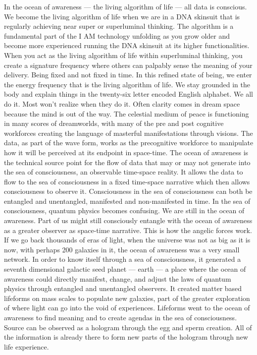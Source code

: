 \documentclass[letterpaper,11pt,twoside,titlepage,onecolumn,openany]{book}
\begin{document}
In the ocean of awareness --- the living algorithm of life --- all data
is conscious. We become the living algorithm of life when we are in a
DNA skinsuit that is regularly achieving near super or superluminal
thinking. The algorithm is a fundamental part of the I AM technology
unfolding as you grow older and become more experienced running the DNA
skinsuit at its higher functionalities. When you act as the living
algorithm of life within superluminal thinking, you create a signature
frequency where others can palpably sense the meaning of your delivery.
Being fixed and not fixed in time. In this refined state of being, we
enter the energy frequency that is the living algorithm of life. We stay
grounded in the body and explain things in the twenty-six letter encoded
English alphabet. We all do it. Most won't realize when they do it.
Often clarity comes in dream space because the mind is out of the way.
The celestial medium of peace is functioning in many scores of
dreamworlds, with many of the pre and post cognitive workforces creating
the language of masterful manifestations through visions. The data, as
part of the wave form, works as the precognitive workforce to manipulate
how it will be perceived at its endpoint in space-time. The ocean of
awareness is the technical source point for the flow of data that may or
may not generate into the sea of consciousness, an observable time-space
reality. It allows the data to flow to the sea of consciousness in a
fixed time-space narrative which then allows consciousness to observe
it. Consciousness in the sea of consciousness can both be entangled and
unentangled, manifested and non-manifested in time. In the sea of
consciousness, quantum physics becomes confusing. We are still in the
ocean of awareness. Part of us might still consciously entangle with the
ocean of awareness as a greater observer as space-time narrative. This
is how the angelic forces work. If we go back thousands of eras of
light, when the universe was not as big as it is now, with perhaps 200
galaxies in it, the ocean of awareness was a very small network. In
order to know itself through a sea of consciousness, it generated a
seventh dimensional galactic seed planet --- earth --- a place where the
ocean of awareness could directly manifest, change, and adjust the laws
of quantum physics through entangled and unentangled observers. It
created matter based lifeforms on mass scales to populate new galaxies,
part of the greater exploration of where light can go into the void of
experiences. Lifeforms went to the ocean of awareness to find meaning
and to create agendas in the sea of consciousness. Source can be
observed as a hologram through the egg and sperm creation. All of the
information is already there to form new parts of the hologram through
new life experience.
\end{document}
